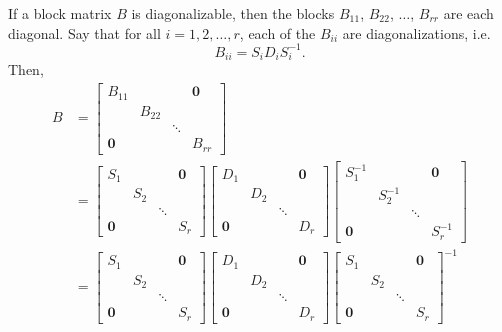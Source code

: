 \begin{lemma}
\label{lem:diagonalizable-block-matrix-has-diagonal-blocks}
If a block matrix $B$ is diagonalizable, then the blocks $B_{11}$, $B_{22}$, $\dots$, $B_{rr}$ are each diagonal.
Say that for all $i = 1, 2, \dots, r$, each of the $B_{ii}$ are diagonalizations, i.e.
$$
B_{ii} = S_i D_i S_i^{-1}.
$$
Then,
\begin{align*}
    B &= \begin{bmatrix}
    B_{11} & & & \mathbf{0} \\
    & B_{22} & & \\
    & & \ddots & \\
    \mathbf{0}& & & B_{rr}
    \end{bmatrix} \\
      &= \begin{bmatrix}
    S_1 & & & \mathbf{0}\\
    & S_2 & & \\
    & & \ddots & \\
    \mathbf{0}& & & S_r
    \end{bmatrix}
    \begin{bmatrix}
    D_1 & & & \mathbf{0}\\
    & D_2 & & \\
    & & \ddots & \\
    \mathbf{0}& & & D_r
    \end{bmatrix}
    \begin{bmatrix}
    S_1^{-1} & & & \mathbf{0}\\
    & S_2^{-1} & & \\
    & & \ddots & \\
    \mathbf{0}& & & S_r^{-1}
    \end{bmatrix} \\
    &= \begin{bmatrix}
    S_1 & & & \mathbf{0} \\
    & S_2 & & \\
    & & \ddots & \\
    \mathbf{0} & & & S_r
    \end{bmatrix}
    \begin{bmatrix}
    D_1 & & & \mathbf{0} \\
    & D_2 & & \\
    & & \ddots & \\
    \mathbf{0} & & & D_r
    \end{bmatrix}
    \begin{bmatrix}
    S_1 & & & \mathbf{0} \\
    & S_2 & & \\
    & & \ddots & \\
    \mathbf{0} & & & S_r
    \end{bmatrix}^{-1}
\end{align*}
\end{lemma}

